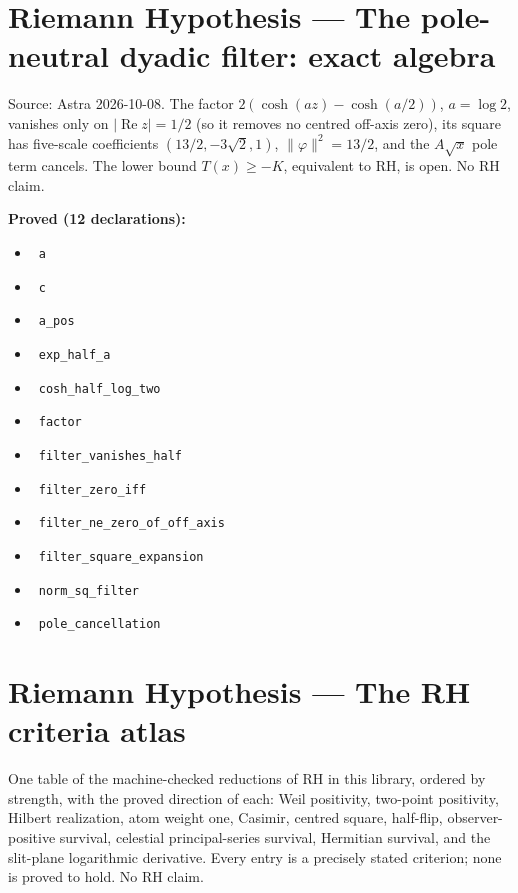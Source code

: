\documentclass{report}
\theoremstyle{definition}
\begin{document}
\section{Riemann Hypothesis --- The pole-neutral dyadic filter: exact algebra}
Source: Astra 2026-10-08. The factor $2(\cosh(az)-\cosh(a/2))$, $a=\log2$, vanishes only on $|\operatorname{Re}z|=1/2$ (so it removes no centred off-axis zero), its square has five-scale coefficients $(13/2,-3\sqrt2,1)$, $\|\varphi\|^2=13/2$, and the $A\sqrt x$ pole term cancels. The lower bound $T(x)\ge-K$, equivalent to RH, is open. No RH claim.

\noindent\textbf{Proved (12 declarations):}
\begin{itemize}
  \item {}\leanok\ \texttt{a}
  \item {}\leanok\ \texttt{c}
  \item {}\leanok\ \texttt{a\_pos}
  \item {}\leanok\ \texttt{exp\_half\_a}
  \item {}\leanok\ \texttt{cosh\_half\_log\_two}
  \item {}\leanok\ \texttt{factor}
  \item {}\leanok\ \texttt{filter\_vanishes\_half}
  \item {}\leanok\ \texttt{filter\_zero\_iff}
  \item {}\leanok\ \texttt{filter\_ne\_zero\_of\_off\_axis}
  \item {}\leanok\ \texttt{filter\_square\_expansion}
  \item {}\leanok\ \texttt{norm\_sq\_filter}
  \item {}\leanok\ \texttt{pole\_cancellation}
\end{itemize}

\section{Riemann Hypothesis --- The RH criteria atlas}
One table of the machine-checked reductions of RH in this library, ordered by strength, with the proved direction of each: Weil positivity, two-point positivity, Hilbert realization, atom weight one, Casimir, centred square, half-flip, observer-positive survival, celestial principal-series survival, Hermitian survival, and the slit-plane logarithmic derivative. Every entry is a precisely stated criterion; none is proved to hold. No RH claim.
\end{document}
